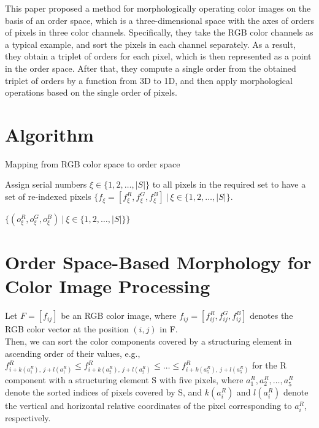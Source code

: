 This paper proposed a method for morphologically operating color images on the basis of an order space, which is a three-dimensional space with the axes of orders of pixels in three color channels. Specifically, they take the RGB color channels as a typical example, and sort the pixels in each channel separately. As a result, they obtain a triplet of orders for each pixel, which is then represented as a point in the order space. After that, they compute a single order from the obtained triplet of orders by a function from 3D to 1D, and then apply morphological operations based on the single order of pixels. 

\section*{Algorithm}
\begin{algorithm}[H]
\caption{Mapping from RGB color space to order space}

Assign serial numbers $\xi \in \{1,2,\ldots, |S|\}$ to all pixels in the required set to have a set of re-indexed pixels  $\{f_{\xi} = [f_{\xi}^{R}, f_{\xi}^{G}, f_{\xi}^{B}]\ |\ \xi \in \{1,2,\ldots, |S|\}$.

\Return $\{(o_{\xi}^{R}, o_{\xi}^{G}, o_{\xi}^{B})\ | \ \xi \in \{1,2,\ldots, |S|\}\}$
\end{algorithm}

\section*{Order Space-Based Morphology for Color Image Processing}

Let $F = [f_{ ij }] $ be an RGB color image, where $f_{ ij } = [f_{ ij }^{R}, f_{ ij }^{G}, f_{ ij }^{B}] $ denotes the RGB color vector at the position $(i,j)$ in F. \\

Then, we can sort the color components covered by a structuring element in ascending order of their values, e.g., 
$f^{R}_{i+k(a_{1}^{R}),\ j+l(a_{1}^{R})  } \leq 
f^{R}_{i+k(a_{2}^{R}),\ j+l(a_{2}^{R})  } \leq \ldots \leq
f^{R}_{i+k(a_{5}^{R}),\ j+l(a_{5}^{R})  }$
for the R component with a structuring element S with five pixels, where $a_{ 1 }^{R},a_{ 2 }^{R},\ldots,a_{ 5 }^{R}$
 denote the sorted indices of pixels covered by S, and $k(a_{i}^{R})$
 and $l(a_{i}^{R})$
 denote the vertical and horizontal relative coordinates of the pixel corresponding to $a_{i}^{R}$, respectively.\\

